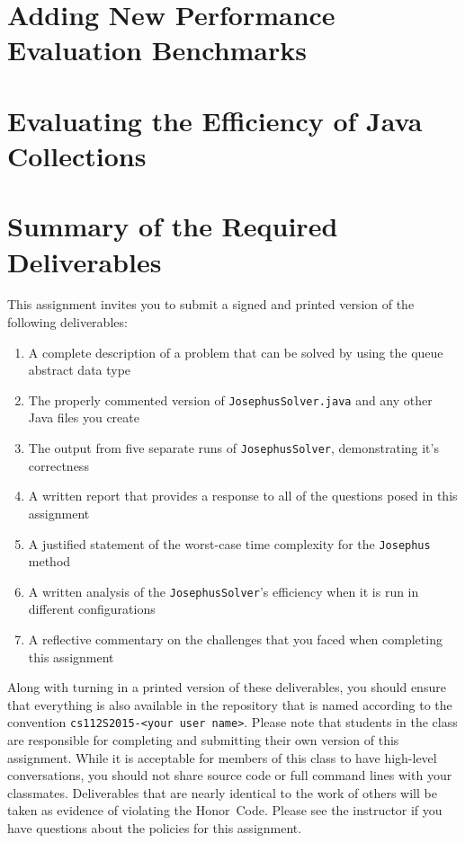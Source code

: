 \section*{Adding New Performance Evaluation Benchmarks}


\section*{Evaluating the Efficiency of Java Collections}


\section*{Summary of the Required Deliverables}

  This assignment invites you to submit a signed and printed version of the following deliverables:

  \begin{enumerate}

  \item A complete description of a problem that can be solved by using the queue abstract data type

  \item The properly commented version of {\tt JosephusSolver.java} and any other Java files you create

  \item The output from five separate runs of {\tt JosephusSolver}, demonstrating it's correctness

  \item A written report that provides a response to all of the questions posed in this assignment

  \item A justified statement of the worst-case time complexity for the {\tt Josephus} method

  \item A written analysis of the {\tt JosephusSolver}'s efficiency when it is run in different configurations

  \item A reflective commentary on the challenges that you faced when completing this assignment

  \end{enumerate}

  Along with turning in a printed version of these deliverables, you should ensure that everything is also available in
  the repository that is named according to the convention {\tt cs112S2015-<your user name>}. Please note that students
  in the class are responsible for completing and submitting their own version of this assignment.    While it is
  acceptable for members of this class to have high-level conversations, you should not share source code or full
  command lines with your classmates.  Deliverables that are nearly identical to the work of others will be taken as
  evidence of violating the \mbox{Honor Code}.  Please see the instructor if you have questions about the policies for
  this assignment.

  
